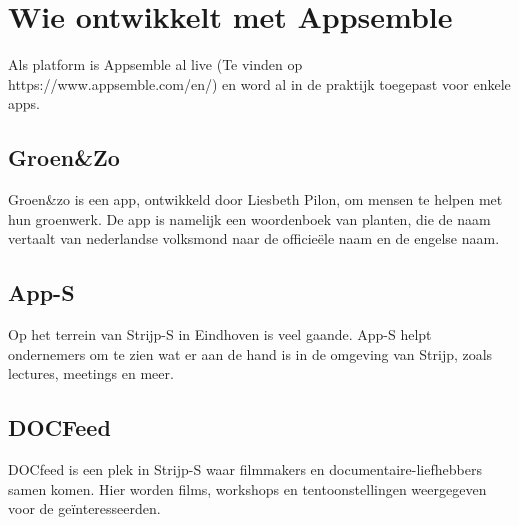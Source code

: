 \chapter{Wie ontwikkelt met Appsemble}


Als platform is Appsemble al live (Te vinden op https://www.appsemble.com/en/) en word al in de praktijk toegepast voor enkele apps.

\section{Groen\&Zo}

Groen\&zo is een app, ontwikkeld door Liesbeth Pilon, om mensen te helpen met hun groenwerk. De app is namelijk een woordenboek van planten, die de naam vertaalt van nederlandse volksmond naar de officie\"{e}le naam en de engelse naam.

\section{App-S}

Op het terrein van Strijp-S in Eindhoven is veel gaande. App-S helpt ondernemers om te zien wat er aan de hand is in de omgeving van Strijp, zoals lectures, meetings en meer.

\section{DOCFeed}

DOCfeed is een plek in Strijp-S waar filmmakers en documentaire-liefhebbers samen komen. Hier worden films, workshops en tentoonstellingen weergegeven voor de ge\"{i}nteresseerden.